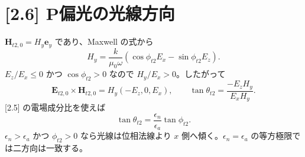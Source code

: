 \documentclass[11pt,a4paper]{article}
\begin{document}
\section*{[2.6] P偏光の光線方向}
$\boldsymbol H_{t2,0}=H_y\boldsymbol e_y$ であり、Maxwell の式から
\[
H_y=\frac{k}{\mu_0\omega}
\left(\cos\phi_{t2}E_x-\sin\phi_{t2}E_z\right).
\]
$E_z/E_x\le0$ かつ $\cos\phi_{t2}>0$ なので $H_y/E_x>0$。したがって
\[
\boldsymbol E_{t2,0}\times\boldsymbol H_{t2,0}
=H_y(-E_z,0,E_x),
\qquad
\tan\theta_{t2}=\frac{-E_zH_y}{E_xH_y}.
\]
[2.5] の電場成分比を使えば
\[
\boxed{\tan\theta_{t2}=\frac{\epsilon_n}{\epsilon_a}\tan\phi_{t2}.}
\]
$\epsilon_n>\epsilon_a$ かつ $\phi_{t2}>0$ なら光線は位相法線より $x$ 側へ傾く。$\epsilon_n=\epsilon_a$ の等方極限では二方向は一致する。
\end{document}
